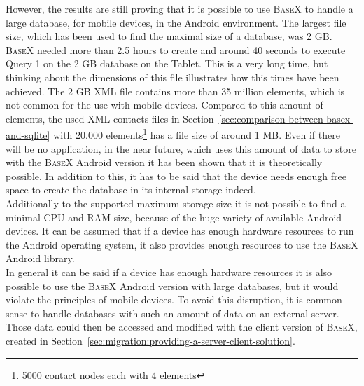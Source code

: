 However, the results are still proving that it is possible to use \textsc{BaseX} to handle a large database, for mobile devices, in the Android environment.
The largest file size, which has been used to find the maximal size of a database, was 2 GB.
\textsc{BaseX} needed more than 2.5 hours to create and around 40 seconds to execute Query 1 on the 2 GB database on the Tablet.
This is a very long time, but thinking about the dimensions of this file illustrates how this times have been achieved.
The 2 GB XML file contains more than 35 million elements, which is not common for the use with mobile devices.
Compared to this amount of elements, the used XML contacts files in Section~\ref{sec:comparison-between-basex-and-sqlite} with 20.000 elements\footnote{5000 contact nodes each with 4 elements} has a file size of around 1 MB.
Even if there will be no application, in the near future, which uses this amount of data to store with the \textsc{BaseX} Android version it has been shown that it is theoretically possible.
In addition to this, it has to be said that the device needs enough free space to create the database in its internal storage indeed.\\
Additionally to the supported maximum storage size it is not possible to find a minimal CPU and RAM size, because of the huge variety of available Android devices.
It can be assumed that if a device has enough hardware resources to run the Android operating system, it also provides enough resources to use the \textsc{BaseX} Android library.\\
In general it can be said if a device has enough hardware resources it is also possible to use the \textsc{BaseX} Android version with large databases, but it would violate the principles of mobile devices.
To avoid this disruption, it is common sense to handle databases with such an amount of data on an external server.
Those data could then be accessed and modified with the client version of \textsc{BaseX}, created in Section~\ref{sec:migration:providing-a-server-client-solution}.




